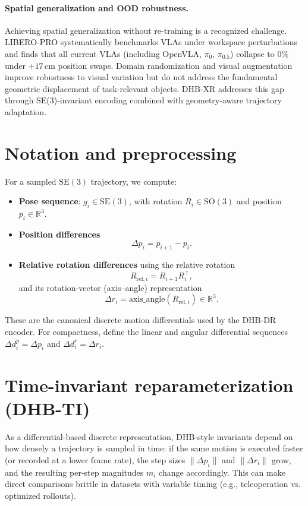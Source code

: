 \documentclass[11pt]{article}
\begin{document}
\paragraph{Spatial generalization and OOD robustness.}
Achieving spatial generalization without re-training is a recognized challenge.
LIBERO-PRO \cite{zhu2025liberopro} systematically benchmarks VLAs under workspace perturbations and finds that all current VLAs (including OpenVLA, $\pi_0$, $\pi_{0.5}$) collapse to 0\% under $+17$\,cm position swaps.
Domain randomization \cite{tobin2017domain} and visual augmentation improve robustness to visual variation but do not address the fundamental geometric displacement of task-relevant objects.
DHB-XR addresses this gap through SE(3)-invariant encoding combined with geometry-aware trajectory adaptation.

\section{Notation and preprocessing}
For a sampled $\mathrm{SE}(3)$ trajectory, we compute:
\begin{itemize}
  \item \textbf{Pose sequence}: $g_i \in \mathrm{SE}(3)$, with rotation $R_i \in \mathrm{SO}(3)$ and position $p_i \in \mathbb{R}^3$.

  \item \textbf{Position differences}
    \begin{equation}
      \Delta p_i = p_{i+1} - p_i.
    \end{equation}

  \item \textbf{Relative rotation differences} using the relative rotation
    \begin{equation}
      R_{\mathrm{rel},i} = R_{i+1} R_i^\top,
    \end{equation}
    and its rotation-vector (axis--angle) representation
    \begin{equation}
      \Delta r_i = \mathrm{axis\_angle}(R_{\mathrm{rel},i}) \in \mathbb{R}^3.
    \end{equation}
\end{itemize}

These are the canonical discrete motion differentials used by the DHB-DR encoder. For compactness, define the linear and angular differential sequences $\Delta d_i^p = \Delta p_i$ and $\Delta d_i^r = \Delta r_i$.

\section{Time-invariant reparameterization (DHB-TI)}
As a differential-based discrete representation, DHB-style invariants depend on how densely a trajectory is sampled in time: if the same motion is executed faster (or recorded at a lower frame rate), the step sizes $\lVert \Delta p_i\rVert$ and $\lVert \Delta r_i\rVert$ grow, and the resulting per-step magnitudes $m_i$ change accordingly. This can make direct comparisons brittle in datasets with variable timing (e.g., teleoperation vs. optimized rollouts).
\end{document}
